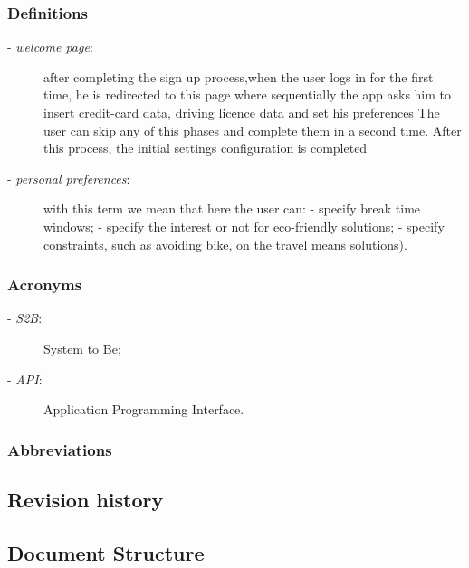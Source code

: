 	\subsubsection{Definitions}
		\begin{description}
			\item[- \textit{welcome page}:] after completing the sign up process,when the user logs in for the first time, he is redirected to this page where sequentially the app asks him to insert credit-card data, driving licence data and set his preferences 
			The user can skip any of this phases and complete them in a second time. After this process, the initial settings configuration is completed
			\item[- \textit{personal preferences}:] with this term we mean that here the user can:\newline
			- specify break time windows; \newline
			- specify the interest or not for eco-friendly solutions;\newline
			- specify constraints, such as avoiding  bike, on the travel means solutions).
		\end{description}
	\subsubsection{Acronyms}
		\begin{description}
		\item[- \textit{S2B}:] System to Be;
		\item[- \textit{API}:] Application Programming Interface.
	\end{description}
	\subsubsection{Abbreviations}
\subsection{Revision history}
\subsection{Document Structure}
